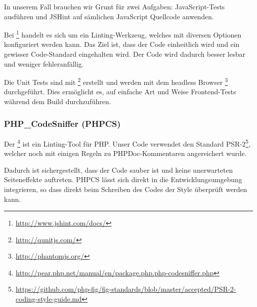In unserem Fall brauchen wir Grunt für zwei Aufgaben: JavaScript-Tests ausführen und JSHint auf sämlichen JavaScript Quellcode anwenden.

Bei \footnote{\url{http://www.jshint.com/docs/}} handelt es sich um ein Linting-Werkzeug, welches mit diversen Optionen konfiguriert werden kann.
Das Ziel ist, dass der Code einheitlich wird und ein gewisser Code-Standard eingehalten wird.
Der Code wird dadurch besser lesbar und weniger fehleranfällig.

Die Unit Tests sind mit \footnote{\url{http://qunitjs.com/}} erstellt und werden mit dem headless Browser \footnote{\url{http://phantomjs.org/}} durchgeführt.
Dies ermöglicht es, auf einfache Art und Weise Frontend-Tests während dem Build durchzuführen.

\subsubsection{PHP\_CodeSniffer (PHPCS)}
\label{phpcs}
Der \footnote{\url{http://pear.php.net/manual/en/package.php.php-codesniffer.php}} ist ein Linting-Tool für PHP.
Unser Code verwendet den Standard PSR-2\footnote{\url{https://github.com/php-fig/fig-standards/blob/master/accepted/PSR-2-coding-style-guide.md}}, welcher noch mit einigen Regeln zu PHPDoc-Kommentaren angereichert wurde.

Dadurch ist sichergestellt, dass der Code sauber ist und keine unerwarteten Seiteneffekte auftreten.
PHPCS lässt sich direkt in die Entwicklungsumgebung integrieren, so dass direkt beim Schreiben des Codes der Style überprüft werden kann.
